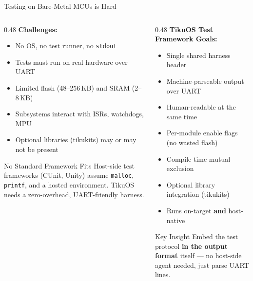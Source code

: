 \documentclass[aspectratio=169, 10pt]{beamer}
\begin{document}
\begin{frame}{Testing on Bare-Metal MCUs is Hard}
\begin{columns}[T]
\begin{column}{0.48\textwidth}
\textbf{Challenges:}
\begin{itemize}
  \item No OS, no test runner, no \texttt{stdout}
  \item Tests must run on real hardware over UART
  \item Limited flash (48--256\,KB) and SRAM (2--8\,KB)
  \item Subsystems interact with ISRs, watchdogs, MPU
  \item Optional libraries (tikukits) may or may not be present
\end{itemize}

\vspace{0.5em}
\begin{alertblock}{No Standard Framework Fits}
Host-side test frameworks (CUnit, Unity) assume \texttt{malloc},
\texttt{printf}, and a hosted environment. TikuOS needs a
zero-overhead, UART-friendly harness.
\end{alertblock}
\end{column}

\begin{column}{0.48\textwidth}
\textbf{TikuOS Test Framework Goals:}
\begin{itemize}
  \item Single shared harness header
  \item Machine-parseable output over UART
  \item Human-readable at the same time
  \item Per-module enable flags (no wasted flash)
  \item Compile-time mutual exclusion
  \item Optional library integration (tikukits)
  \item Runs on-target \textbf{and} host-native
\end{itemize}

\vspace{0.5em}
\begin{block}{Key Insight}
Embed the test protocol \textbf{in the output format} itself ---
no host-side agent needed, just parse UART lines.
\end{block}
\end{column}
\end{columns}
\end{frame}
\end{document}
